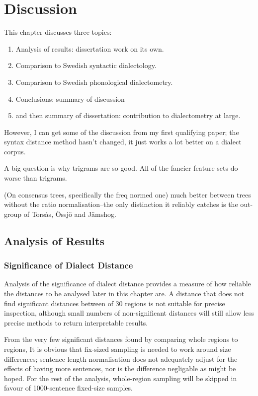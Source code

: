 \chapter{Discussion}

This chapter discusses three topics:

\begin{enumerate}
\item Analysis of results: dissertation work on its own.
\item Comparison to Swedish syntactic dialectology.
\item Comparison to Swedish phonological dialectometry.
\item Conclusions: summary of discussion
\item and then summary of dissertation: contribution to dialectometry at large.
\end{enumerate}

However, I can get some of the discussion from my first qualifying
paper; the syntax distance method hasn't changed, it just works a lot
better on a dialect corpus.

A big question is why trigrams are so good. All of the fancier feature
sets do worse than trigrams.

(On consensus trees, specifically the freq normed one)
much better between trees without the ratio normalisation--the only
distinction it reliably catches is the out-group of Tors\.as, \"Ossj\"o
and J\"amshog.


\section{Analysis of Results}

\subsection{Significance of Dialect Distance}

Analysis of the significance of dialect distance provides a measure of
how reliable the distances to be analysed later in this chapter are. A
distance that does not find significant distances between of 30
regions is not suitable for precise inspection, although small numbers
of non-significant distances will still allow less precise methods to
return interpretable results.

From the very few significant distances found by comparing whole
regions to regions, It is obvious that fix-sized sampling is needed to
work around size differences; sentence length normalisation does not
adequately adjust for the effects of having more sentences, nor is the
difference negligable as might be hoped. For the rest of the analysis,
whole-region sampling will be skipped in favour of 1000-sentence
fixed-size samples.

